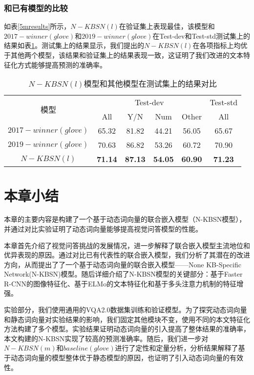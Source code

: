 \subsubsection{和已有模型的比较}
如表\ref{5mresults}所示，$N-KBSN(l)$在验证集上表现最佳，该模型和$2017-winner(glove)$和$2019-winner(glove)$在Test-dev和Test-std测试集上的结果如表\ref{testres}。测试集上的结果显示，我们提出的$N-KBSN(l)$在各项指标上均优于其他两个模型，该结果和验证集上的结果表现一致，这证明了我们改进的文本特征化方式能够提高预测的准确率。
\begin{table}[H]
\centering
\caption{$N-KBSN(l)$模型和其他模型在测试集上的结果对比}
\begin{tabular}{c|cccc|c}
\toprule
\multirow{2}{*}{模型} & \multicolumn{4}{c}{Test-dev} & Test-std\\
& All & Y/N & Num & Other & All \\
\midrule
$2017-winner(glove)$ & 65.32 & 81.82 & 44.21 & 56.05 & 65.67\\
$2019-winner(glove)$ & 70.63 & 86.82 & 53.26 & 60.72 & 70.90\\
\midrule
$N-KBSN(l)$& \textbf{71.14} & \textbf{87.13} & \textbf{54.05} & \textbf{60.90} & \textbf{71.23} \\
\bottomrule
\end{tabular}
\label{testres}
\end{table}

\section{本章小结}
本章的主要内容是构建了一个基于动态词向量的联合嵌入模型（N-KBSN模型），并通过对比实验证明了动态词向量能够提高视觉问答模型的性能。

本章首先介绍了视觉问答挑战的发展情况，进一步解释了联合嵌入模型主流地位和优异表现的原因。通过对比已有代表性的联合嵌入模型，我们分析了其潜在的改进方向，从而提出了了一个基于动态词向量的联合嵌入模型——None KB-Specific Network(N-KBSN)模型。随后详细介绍了N-KBSN模型的关键部分：基于Faster R-CNN的图像特征化、基于ELMo的文本特征化和基于多头注意力机制的特征增强。

实验部分，我们使用通用的VQA2.0数据集训练和验证模型。为了探究动态词向量和静态词向量对实验结果的影响，我们固定其他模块不变，使用不同的本文特征化方法构建了多个模型。实验结果证明动态词向量的引入提高了整体结果的准确率，本文构建的N-KBSN实现了较高的预测准确率。随后，我们进一步对$N-KBSN(m)$和$baseline(glove)$进行了定性和定量分析，分析结果解释了基于动态词向量的模型整体优于静态模型的原因，也证明了引入动态词向量的有效性。



